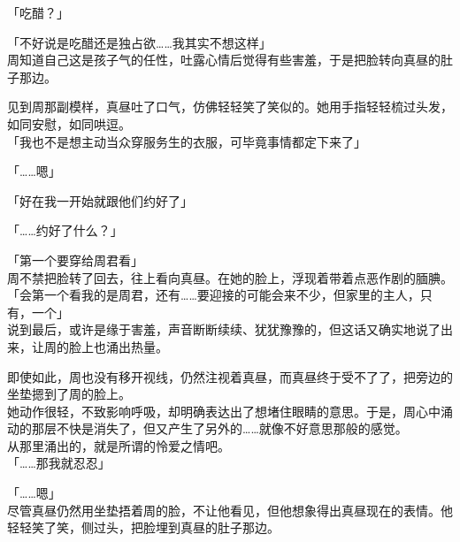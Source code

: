 「吃醋？」

「不好说是吃醋还是独占欲……我其实不想这样」\\

周知道自己这是孩子气的任性，吐露心情后觉得有些害羞，于是把脸转向真昼的肚子那边。

见到周那副模样，真昼吐了口气，仿佛轻轻笑了笑似的。她用手指轻轻梳过头发，如同安慰，如同哄逗。\\

「我也不是想主动当众穿服务生的衣服，可毕竟事情都定下来了」

「……嗯」

「好在我一开始就跟他们约好了」

「……约好了什么？」

「第一个要穿给周君看」\\

周不禁把脸转了回去，往上看向真昼。在她的脸上，浮现着带着点恶作剧的腼腆。\\

「会第一个看我的是周君，还有……要迎接的可能会来不少，但家里的主人，只有，一个」\\

说到最后，或许是缘于害羞，声音断断续续、犹犹豫豫的，但这话又确实地说了出来，让周的脸上也涌出热量。

即使如此，周也没有移开视线，仍然注视着真昼，而真昼终于受不了了，把旁边的坐垫摁到了周的脸上。\\

她动作很轻，不致影响呼吸，却明确表达出了想堵住眼睛的意思。于是，周心中涌动的那层不快是消失了，但又产生了另外的……就像不好意思那般的感觉。\\

从那里涌出的，就是所谓的怜爱之情吧。\\

「……那我就忍忍」

「……嗯」\\

尽管真昼仍然用坐垫捂着周的脸，不让他看见，但他想象得出真昼现在的表情。他轻轻笑了笑，侧过头，把脸埋到真昼的肚子那边。
